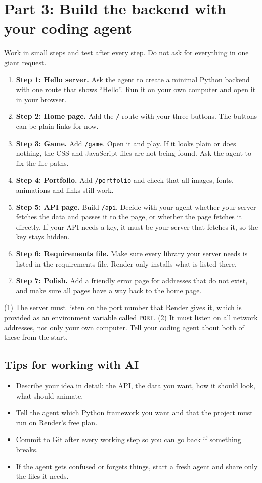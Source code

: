 \documentclass[11pt,a4paper]{article}
\begin{document}
\section{Part 3: Build the backend with your coding agent}
Work in small steps and test after every step. Do not ask for everything in one giant request.

\begin{enumerate}
\item \textbf{Step 1: Hello server.} Ask the agent to create a minimal Python backend with one route that shows ``Hello''. Run it on your own computer and open it in your browser.
\item \textbf{Step 2: Home page.} Add the \texttt{/} route with your three buttons. The buttons can be plain links for now.
\item \textbf{Step 3: Game.} Add \texttt{/game}. Open it and play. If it looks plain or does nothing, the CSS and JavaScript files are not being found. Ask the agent to fix the file paths.
\item \textbf{Step 4: Portfolio.} Add \texttt{/portfolio} and check that all images, fonts, animations and links still work.
\item \textbf{Step 5: API page.} Build \texttt{/api}. Decide with your agent whether your server fetches the data and passes it to the page, or whether the page fetches it directly. If your API needs a key, it must be your server that fetches it, so the key stays hidden.
\item \textbf{Step 6: Requirements file.} Make sure every library your server needs is listed in the requirements file. Render only installs what is listed there.
\item \textbf{Step 7: Polish.} Add a friendly error page for addresses that do not exist, and make sure all pages have a way back to the home page.
\end{enumerate}

\begin{note}
(1) The server must listen on the port number that Render gives it, which is provided as an environment variable called \texttt{PORT}. (2) It must listen on all network addresses, not only your own computer. Tell your coding agent about both of these from the start.
\end{note}

\subsection*{Tips for working with AI}
\begin{itemize}
\item Describe your idea in detail: the API, the data you want, how it should look, what should animate.
\item Tell the agent which Python framework you want and that the project must run on Render's free plan.
\item Commit to Git after every working step so you can go back if something breaks.
\item If the agent gets confused or forgets things, start a fresh agent and share only the files it needs.
\end{itemize}
\end{document}
